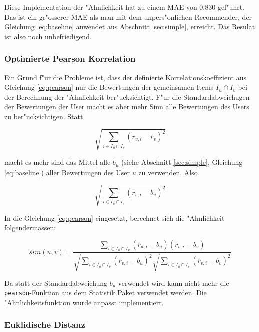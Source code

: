 \documentclass[a4paper, 12pt]{article}
\begin{document}
Diese Implementation der "Ahnlichkeit hat zu einem MAE von 0.830 gef"uhrt. Das ist ein gr"osserer MAE als man mit dem unpers"onlichen Recommender, der Gleichung \ref{eq:baseline} anwendet aus Abschnitt \ref{sec:simple}, erreicht. Das Resulat ist also noch unbefriedigend.


\subsubsection{Optimierte Pearson Korrelation}
\label{sec:optpearson}

Ein Grund f"ur die Probleme ist, dass der definierte Korrelationskoeffizient aus Gleichung \ref{eq:pearson} nur die Bewertungen der gemeinsamen Items  $I_u \cap I_v$ bei der Berechnung der "Ahnlichkeit ber"ucksichtigt. F"ur die Standardabweichugen der Bewertungen der User macht es aber mehr Sinn alle Bewertungen des Users zu ber"ucksichtigen. Statt 

\begin{equation}
  \label{eq:naiv}
  \sqrt{\sum_{i \in I_u \cap I_v}( r_{v,i} - \bar{r}_v)^2}
\end{equation}

macht es mehr sind das Mittel alle $b_u$ (siehe Abschnitt \ref{sec:simple}, Gleichung \ref{eq:baseline}) aller Bewertungen des User $u$ zu verwenden. Also

\begin{equation}
  \label{eq:naiv}
  \sqrt{\sum_{i \in I_u \cap I_v}( r_{v,i} - b_u)^2}
\end{equation}

In die Gleichung \ref{eq:pearson} eingesetzt, berechnet sich die "Ahnlichkeit folgendermassen:

\begin{equation}
  \label{eq:advanced}
  sim(u,v)  = \frac{\sum_{i \in I_u \cap I_v}(r_{u,i} - b_u)(r_{v,i} - b_v)}{\sqrt{\sum_{i \in I_u \cap I_v}( r_{v,i} - b_u)^2}\sqrt{\sum_{i \in I_u \cap I_v}( r_{v,i} - b_v)^2}}
\end{equation}

Da statt der Standardabweichung $b_u$ verwendet wird kann nicht mehr die \verb|pearson|-Funktion aus dem Statistik Paket verwendet werden. Die "Ahnlichkeitsfunktion wurde anpasst implementiert.

\subsubsection{Euklidische Distanz}
\label{sec:euclid}
\end{document}

